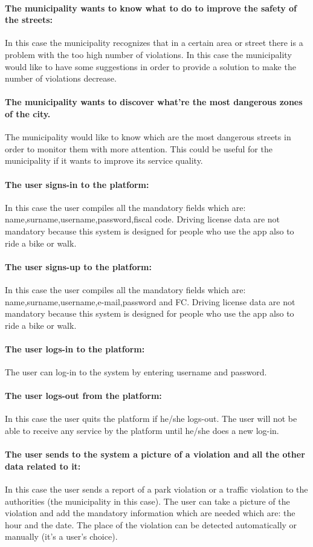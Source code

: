 \documentclass[titlepage]{article}
\begin{document}
\paragraph{The municipality wants to know what to do to 				improve the safety of the streets: }
In this case the municipality recognizes that in a certain area or street there is a problem with the too high number of violations. In this case the municipality would like to have some suggestions in order to provide a solution to make the number of violations decrease.
\paragraph{The municipality wants to discover what're the most dangerous zones of the city.}
The municipality would like to know which are the most dangerous streets in order to monitor them with more attention. This could be useful for the municipality if it wants to improve its service quality.
\paragraph{The user signs-in to the platform: }
In this case the user compiles all the mandatory fields which are: name,surname,username,password,fiscal code. Driving license data are not mandatory because this system is designed for people who use the app also to ride a bike or walk.
\paragraph{The user signs-up to the platform: }
In this case the user compiles all the mandatory fields which are: name,surname,username,e-mail,password and FC. Driving license data are not mandatory because this system is designed for people who use the app also to ride a bike or walk.
\paragraph{The user logs-in to the platform: }
The user can log-in to the system by entering username and password.
\paragraph{The user logs-out from the platform:}
In this case the user quits the platform if he/she logs-out. The user will not be able to receive any service  by the platform until he/she does a new log-in.
\paragraph{The user sends to the system a picture of a            	violation and all the other data related to it: }
In this case the user sends a report of a park violation or a traffic violation to the authorities (the municipality in this case). The user can take a picture of the violation and add the mandatory information which are needed which are: the hour and the date. The place of the violation can be detected automatically or manually (it's a user's choice).
\end{document}
